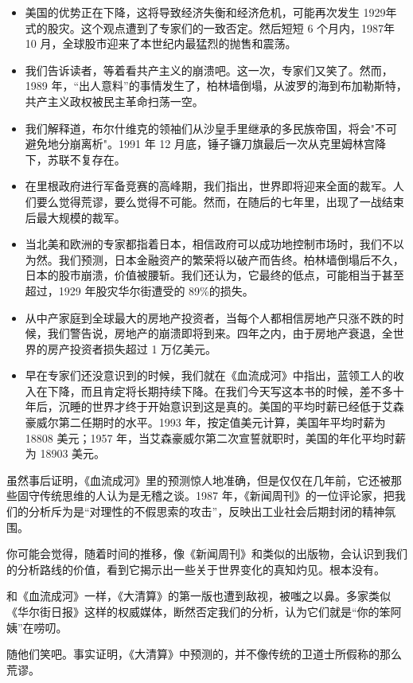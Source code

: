 \begin{itemize}
    \item 美国的优势正在下降，这将导致经济失衡和经济危机，可能再次发生 1929年式的股灾。这个观点遭到了专家们的一致否定。然后短短 6 个月内，1987年 10 月，全球股市迎来了本世纪内最猛烈的抛售和震荡。
    \item 我们告诉读者，等着看共产主义的崩溃吧。这一次，专家们又笑了。然而，1989 年，“出人意料”的事情发生了，柏林墙倒塌，从波罗的海到布加勒斯特，共产主义政权被民主革命扫荡一空。
    \item 我们解释道，布尔什维克的领袖们从沙皇手里继承的多民族帝国，将会"不可避免地分崩离析"。1991 年 12 月底，锤子镰刀旗最后一次从克里姆林宫降下，苏联不复存在。
    \item 在里根政府进行军备竞赛的高峰期，我们指出，世界即将迎来全面的裁军。人们要么觉得荒谬，要么觉得不可能。然而，在随后的七年里，出现了一战结束后最大规模的裁军。
    \item 当北美和欧洲的专家都指着日本，相信政府可以成功地控制市场时，我们不以为然。我们预测，日本金融资产的繁荣将以破产而告终。柏林墙倒塌后不久，日本的股市崩溃，价值被腰斩。我们还认为，它最终的低点，可能相当于甚至超过，1929 年股灾华尔街遭受的 89\%的损失。
    \item 从中产家庭到全球最大的房地产投资者，当每个人都相信房地产只涨不跌的时候，我们警告说，房地产的崩溃即将到来。四年之内，由于房地产衰退，全世界的房产投资者损失超过 1 万亿美元。
    \item 早在专家们还没意识到的时候，我们就在《血流成河》中指出，蓝领工人的收入在下降，而且肯定将长期持续下降。在我们今天写这本书的时候，差不多十年后，沉睡的世界才终于开始意识到这是真的。美国的平均时薪已经低于艾森豪威尔第二任期时的水平。1993 年，按定值美元计算，美国年平均时薪为 18808 美元；1957 年，当艾森豪威尔第二次宣誓就职时，美国的年化平均时薪为 18903 美元。
\end{itemize}


虽然事后证明，《血流成河》里的预测惊人地准确，但是仅仅在几年前，它还被那些固守传统思维的人认为是无稽之谈。1987 年，《新闻周刊》的一位评论家，把我们的分析斥为是“对理性的不假思索的攻击”，反映出工业社会后期封闭的精神氛围。


你可能会觉得，随着时间的推移，像《新闻周刊》和类似的出版物，会认识到我们的分析路线的价值，看到它揭示出一些关于世界变化的真知灼见。根本没有。


和《血流成河》一样，《大清算》的第一版也遭到敌视，被嗤之以鼻。多家类似《华尔街日报》这样的权威媒体，断然否定我们的分析，认为它们就是“你的笨阿姨”在唠叨。


随他们笑吧。事实证明，《大清算》中预测的，并不像传统的卫道士所假称的那么荒谬。

